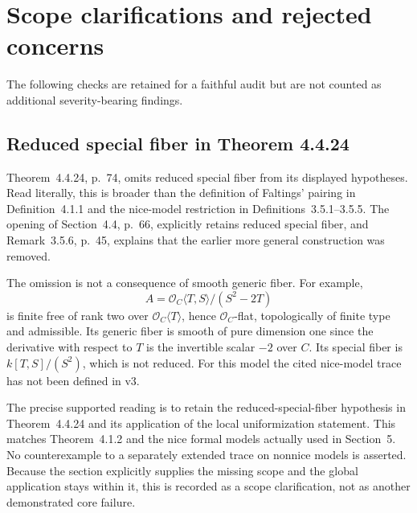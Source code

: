 \documentclass[10pt]{article}
\begin{document}
\section*{Scope clarifications and rejected concerns}
The following checks are retained for a faithful audit but are not counted as additional severity-bearing findings.\par
\subsection*{Reduced special fiber in Theorem 4.4.24}
Theorem 4.4.24, p. 74, omits reduced special fiber from its displayed hypotheses. Read literally, this is broader than the definition of Faltings’ pairing in Definition 4.1.1 and the nice-model restriction in Definitions 3.5.1–3.5.5. The opening of Section 4.4, p. 66, explicitly retains reduced special fiber, and Remark 3.5.6, p. 45, explains that the earlier more general construction was removed.\par
The omission is not a consequence of smooth generic fiber. For example, \[A=\mathcal O_C\langle T,S\rangle/(S^2-2T)\] is finite free of rank two over \(\mathcal O_C\langle T\rangle\), hence \(\mathcal O_C\)-flat, topologically of finite type and admissible. Its generic fiber is smooth of pure dimension one since the derivative with respect to \(T\) is the invertible scalar \(-2\) over \(C\). Its special fiber is \(k[T,S]/(S^2)\), which is not reduced. For this model the cited nice-model trace has not been defined in v3.\par
The precise supported reading is to retain the reduced-special-fiber hypothesis in Theorem 4.4.24 and its application of the local uniformization statement. This matches Theorem 4.1.2 and the nice formal models actually used in Section 5. No counterexample to a separately extended trace on nonnice models is asserted. Because the section explicitly supplies the missing scope and the global application stays within it, this is recorded as a scope clarification, not as another demonstrated core failure.\par
\end{document}
